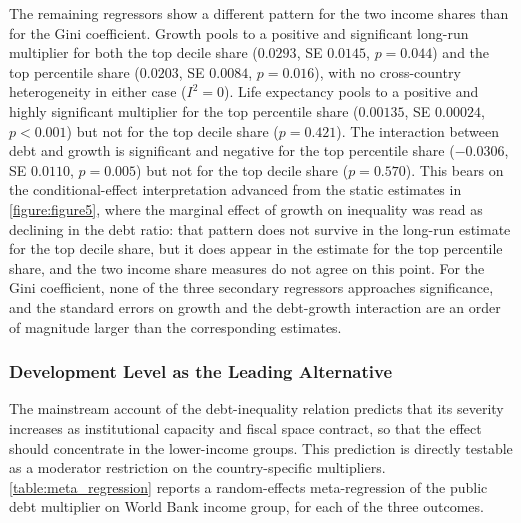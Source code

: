\documentclass[12pt, titlepage]{article}
\numberwithin{equation}{section}
\begin{document}
The remaining regressors show a different pattern for the two income shares
than for the Gini coefficient. Growth pools to a positive and significant
long-run multiplier for both the top decile share ($0.0293$, SE $0.0145$,
$p=0.044$) and the top percentile share ($0.0203$, SE $0.0084$, $p=0.016$),
with no cross-country heterogeneity in either case ($I^{2}=0$). Life
expectancy pools to a positive and highly significant multiplier for the top
percentile share ($0.00135$, SE $0.00024$, $p<0.001$) but not for the top
decile share ($p=0.421$). The interaction between debt and growth is
significant and negative for the top percentile share ($-0.0306$, SE
$0.0110$, $p=0.005$) but not for the top decile share ($p=0.570$). This bears
on the conditional-effect interpretation advanced from the static estimates in
\autoref{figure:figure5}, where the marginal effect of growth on inequality
was read as declining in the debt ratio: that pattern does not survive in the
long-run estimate for the top decile share, but it does appear in the estimate
for the top percentile share, and the two income share measures do not agree
on this point. For the Gini coefficient, none of the three secondary
regressors approaches significance, and the standard errors on growth and the
debt-growth interaction are an order of magnitude larger than the
corresponding estimates.

\subsubsection{Development Level as the Leading Alternative}

The mainstream account of the debt-inequality relation predicts that its
severity increases as institutional capacity and fiscal space contract, so
that the effect should concentrate in the lower-income groups. This prediction
is directly testable as a moderator restriction on the country-specific
multipliers. \autoref{table:meta_regression} reports a random-effects
meta-regression of the public debt multiplier on World Bank income group, for
each of the three outcomes.
\end{document}
